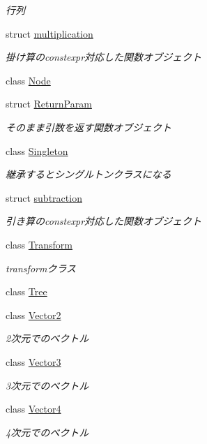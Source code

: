 \begin{DoxyCompactItemize}
\begin{DoxyCompactList}\small\item\em 行列 \end{DoxyCompactList}\item 
struct \mbox{\hyperlink{structsaki_1_1multiplication}{multiplication}}
\begin{DoxyCompactList}\small\item\em 掛け算のconstexpr対応した関数オブジェクト \end{DoxyCompactList}\item 
class \mbox{\hyperlink{classsaki_1_1_node}{Node}}
\item 
struct \mbox{\hyperlink{structsaki_1_1_return_param}{Return\+Param}}
\begin{DoxyCompactList}\small\item\em そのまま引数を返す関数オブジェクト \end{DoxyCompactList}\item 
class \mbox{\hyperlink{classsaki_1_1_singleton}{Singleton}}
\begin{DoxyCompactList}\small\item\em 継承するとシングルトンクラスになる \end{DoxyCompactList}\item 
struct \mbox{\hyperlink{structsaki_1_1subtraction}{subtraction}}
\begin{DoxyCompactList}\small\item\em 引き算のconstexpr対応した関数オブジェクト \end{DoxyCompactList}\item 
class \mbox{\hyperlink{classsaki_1_1_transform}{Transform}}
\begin{DoxyCompactList}\small\item\em transformクラス \end{DoxyCompactList}\item 
class \mbox{\hyperlink{classsaki_1_1_tree}{Tree}}
\item 
class \mbox{\hyperlink{classsaki_1_1_vector2}{Vector2}}
\begin{DoxyCompactList}\small\item\em 2次元でのベクトル \end{DoxyCompactList}\item 
class \mbox{\hyperlink{classsaki_1_1_vector3}{Vector3}}
\begin{DoxyCompactList}\small\item\em 3次元でのベクトル \end{DoxyCompactList}\item 
class \mbox{\hyperlink{classsaki_1_1_vector4}{Vector4}}
\begin{DoxyCompactList}\small\item\em 4次元でのベクトル \end{DoxyCompactList}\end{DoxyCompactItemize}
